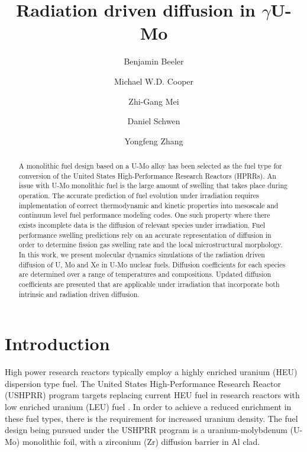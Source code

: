 \documentclass[review]{elsarticle}
\begin{document}
\begin{frontmatter}
\title{Radiation driven diffusion in $\gamma$U-Mo}

\author[inl]{Benjamin Beeler}
\author[lanl]{Michael W.D. Cooper}
\author[anl]{Zhi-Gang Mei}
\author[inl]{Daniel Schwen}
\author[inl]{Yongfeng Zhang}
\address[inl]{Idaho National Laboratory, Idaho Falls, ID 83415}
\address[lanl]{Los Alamos National Laboratory, Los Alamos, NM 87545}
\address[anl]{Argonne National Laboratory, Lemont, IL 60439}

\begin{abstract}
A monolithic fuel design based on a U-Mo alloy has been selected as the fuel type for conversion of the United States High-Performance Research Reactors (HPRRs). An issue with U-Mo monolithic fuel is the large amount of swelling that takes place during operation. The accurate prediction of fuel evolution under irradiation requires implementation of correct thermodynamic and kinetic properties into mesoscale and continuum level fuel performance modeling codes. One such property where there exists incomplete data is the diffusion of relevant species under irradiation. Fuel performance swelling predictions rely on an accurate representation of diffusion in order to determine fission gas swelling rate and the local microstructural morphology. In this work, we present molecular dynamics simulations of the radiation driven diffusion of U, Mo and Xe in U-Mo nuclear fuels. Diffusion coefficients for each species are determined over a range of temperatures and compositions. Updated diffusion coefficients are presented that are applicable under irradiation that incorporate both intrinsic and radiation driven diffusion. 


\end{abstract}
\end{frontmatter}

\linenumbers
\modulolinenumbers[5]

\section{Introduction}

High power research reactors typically employ a highly enriched uranium (HEU) dispersion type fuel. The United States High-Performance Research Reactor (USHPRR) program targets replacing current HEU fuel in research reactors with low enriched uranium (LEU) fuel \cite{snelgrove1997}. In order to achieve a reduced enrichment in these fuel types, there is the requirement for increased uranium density. The fuel design being pursued under the USHPRR program is a uranium-molybdenum (U-Mo) monolithic foil, with a zirconium (Zr) diffusion barrier in Al clad.
\end{document}
